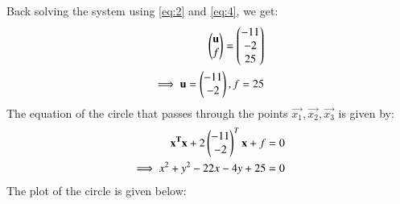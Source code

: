 \documentclass[journal,12pt,twocolumn]{IEEEtran}
\begin{document}
Back solving the system using \eqref{eq:2} and \eqref{eq:4}, we get:
\begin{align}
\begin{pmatrix}\mathbf{u}\\f\end{pmatrix}=\begin{pmatrix}-11 \\ -2 \\ 25\end{pmatrix} \\
\implies \mathbf{u} = \begin{pmatrix}-11 \\ -2\end{pmatrix}, f = 25
\end{align}
The equation of the circle that passes through the points $\vec{x_1}, \vec{x_2}, \vec{x_3}$ is given by:
\begin{align}
\mathbf{x^Tx}+2\begin{pmatrix}-11 \\ -2\end{pmatrix}^T\mathbf{x}+f = 0 \\
\implies x^2 + y^2 - 22x -4y + 25 = 0
\end{align}
The plot of the circle is given below:
\end{document}
